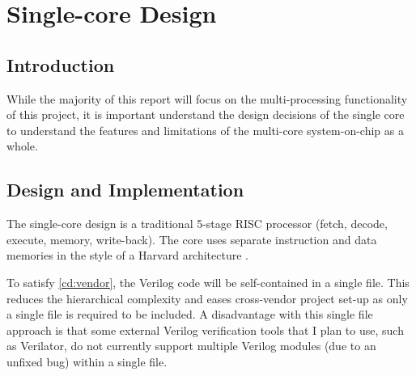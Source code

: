 
\chapter{Single-core Design}
\startcontents[chapters]

\section{Introduction}
While the majority of this report will focus on the multi-processing functionality of this project, it is important understand the design decisions of the single core to understand the features and limitations of the multi-core system-on-chip as a whole.

\section{Design and Implementation}
The single-core design is a traditional 5-stage RISC processor (fetch, decode, execute, memory, write-back). The core uses separate instruction and data memories in the style of a Harvard architecture \cite{harvard}.

To satisfy \ref{cd:vendor}, the Verilog code will be self-contained in a single file. This reduces the hierarchical complexity and eases cross-vendor project set-up as only a single file is required to be included. 
A disadvantage with this single file approach is that some external Verilog verification tools that I plan to use, such as Verilator, do not currently support multiple Verilog modules (due to an unfixed bug) within a single file. 

